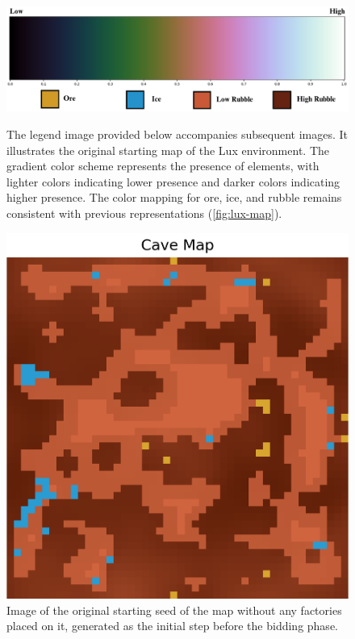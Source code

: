 \begin{figure}[htbp]
    \centering
    \begin{minipage}{1\textwidth}
        \centering
        \includegraphics[width=0.8\linewidth]{images/methods_mono/factory_placement/grad.png}
        \captionsetup{justification=justified, singlelinecheck=false, width=1\linewidth, labelfont=bf} 
        \caption{The legend image provided below accompanies subsequent images. It illustrates the original starting map of the Lux environment. The gradient color scheme represents the presence of elements, with lighter colors indicating lower presence and darker colors indicating higher presence. The color mapping for ore, ice, and rubble remains consistent with previous representations (\autoref{fig:lux-map}).}
        \label{fig:grad-image}
    \end{minipage}\hfill
    \centering
    \begin{minipage}{1\textwidth}
        \centering
        \includegraphics[width=0.3\linewidth]{images/methods_mono/factory_placement/cave_map.png}
        \captionsetup{justification=justified, singlelinecheck=false, width=1\linewidth, labelfont=bf} 
        \caption{Image of the original starting seed of the map without any factories placed on it, generated as the initial step before the bidding phase.}
        \label{fig:grad-map}
    \end{minipage}\hfill
    \vspace{8pt}
    

\end{figure}
